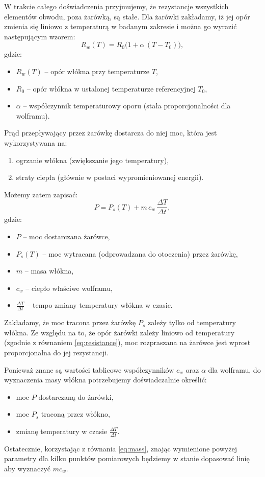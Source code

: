 \documentclass[12pt]{article}
\begin{document}
W trakcie całego doświadczenia przyjmujemy, że rezystancje wszystkich elementów obwodu, poza żarówką, są stałe.  
Dla żarówki zakładamy, iż jej opór zmienia się liniowo z temperaturą w badanym zakresie i można go wyrazić następującym wzorem:
\begin{equation}
    R_w(T) = R_0 \bigl(1+\alpha\,(T - T_0)\bigr),
    \label{eq:resistance}
\end{equation}
gdzie:
\begin{itemize}
\item $R_w(T)$ – opór włókna przy temperaturze $T$,  
\item $R_0$ – opór włókna w ustalonej temperaturze referencyjnej $T_0$,  
\item $\alpha$ – współczynnik temperaturowy oporu (stała proporcjonalności dla wolframu).
\end{itemize}

Prąd przepływający przez żarówkę dostarcza do niej moc, która jest wykorzystywana na:  
\begin{enumerate}
\item ogrzanie włókna (zwiększanie jego temperatury),  
\item straty ciepła (głównie w postaci wypromieniowanej energii).  
\end{enumerate}
Możemy zatem zapisać:
\begin{equation}
    P = P_s(T) + m\,c_w\,\frac{\Delta T}{\Delta t},
    \label{eq:mass}
\end{equation}
gdzie:  
\begin{itemize}
\item $P$ – moc dostarczana żarówce,  
\item $P_s(T)$ – moc wytracana (odprowadzana do otoczenia) przez żarówkę,  
\item $m$ – masa włókna,  
\item $c_w$ – ciepło właściwe wolframu,  
\item $\frac{\Delta T}{\Delta t}$ – tempo zmiany temperatury włókna w czasie.  
\end{itemize}

Zakładamy, że moc tracona przez żarówkę $P_s$ zależy tylko od temperatury włókna. Ze względu na to, że opór żarówki zależy liniowo od temperatury (zgodnie z równaniem \eqref{eq:resistance}), moc rozpraszana na żarówce jest wprost proporcjonalna do jej rezystancji.

Ponieważ znane są wartości tablicowe współczynników $c_w$ oraz $\alpha$ dla wolframu, do wyznaczenia masy włókna potrzebujemy doświadczalnie określić:  
\begin{itemize}
\item moc $P$ dostarczaną do żarówki,  
\item moc $P_s$ traconą przez włókno,  
\item zmianę temperatury w czasie $\frac{\Delta T}{\Delta t}$.  
\end{itemize}
Ostatecznie, korzystając z równania \eqref{eq:mass}, znając wymienione powyżej parametry dla kilku punktów pomiarowych będziemy w stanie dopasować linię aby wyznaczyć $mc_w$.
\end{document}
